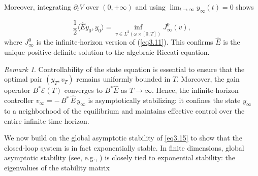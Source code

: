 \documentclass[10pt, a4]{amsart}
\makeatletter
\theoremstyle{plain}
\theoremstyle{definition}
\theoremstyle{remark}
\newtheorem{remark}[lemma]{Remark}
\renewenvironment{proof}[1][\proofname]{\par
  \pushQED{\qed}%
  \normalfont \topsep6\p@\@plus6\p@\relax
  \trivlist
  \item[\hskip\labelsep
        \itshape
    #1\ \ref{#1}.]\ignorespaces
}{%
  \popQED\endtrivlist\@endpefalse
}
\numberwithin{equation}{section}
\def\to{\rightarrow}
\makeatother
\begin{document}
\begin{proof}[of Lemma \ref{le3.4}]
Moreover, integrating $\partial_t V$ over $(0,+\infty)$  and using $\lim_{t\to\infty}y_{\infty}(t)=0$ shows

\begin{equation}\label{eq3.27}
\dfrac{1}{2}\langle\hat{E}y_0,y_0\rangle =\inf_{v\in L^2(\omega\times[0,T])} J^0 _{\infty}(v),
\end{equation}
where \(J^0_{\infty}\) 
  is the infinite‑horizon version of (\ref{eq3.11}). This confirms  \(\hat{E}\) is the unique positive‑definite solution to the algebraic Riccati equation.

\end{proof}
\begin{remark}
Controllability of the state equation is essential to ensure that the optimal pair $(y_T, v_T)$ remains uniformly bounded in $T$.  Moreover, the gain operator $B^*\mathcal{E}(T)$ converges to $B^*\hat{E}$ as $T\to\infty$. Hence, the infinite‑horizon controller $ v_\infty = -\,B^*\,\hat{E}\,y_\infty$
 is asymptotically stabilizing: it confines the state $y_\infty$ to a neighborhood of the equilibrium and maintains effective control over the entire infinite time horizon.

\end{remark}
We now build on the global asymptotic stability of \eqref{eq3.15} to show that the closed‑loop system is in fact exponentially stable. In finite dimensions, global asymptotic stability (see, e.g., \cite{ref61, ref60}) is closely tied to exponential stability: the eigenvalues of the stability matrix
\end{document}
